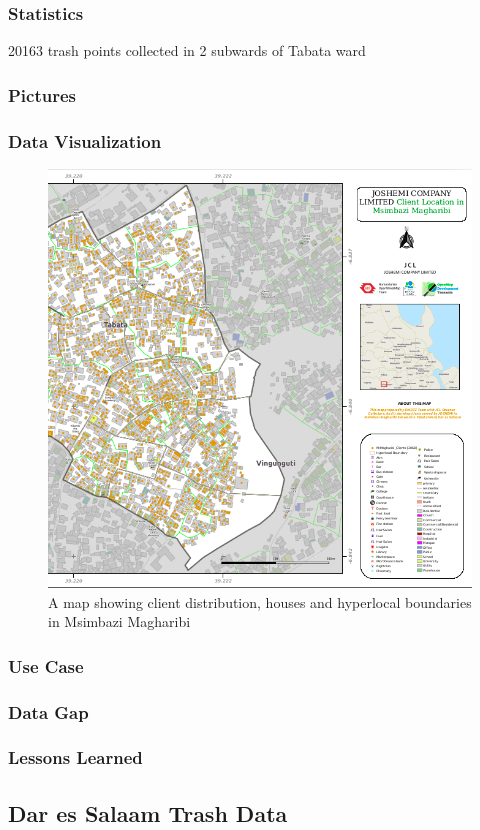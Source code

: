 \documentclass[a4paper,12pt,twoside]{article}
\begin{document}
\subsubsection{Statistics}
20163 trash points collected in 2 subwards of Tabata ward
\subsubsection{Pictures}
\newpage
\subsubsection{Data Visualization}
\begin{figure}[h]
  \color{RHgreen}\caption{A map showing client distribution, houses and hyperlocal boundaries in Msimbazi Magharibi}
  \centering
 \includegraphics[width=0.8 \textwidth]{images/msimbazi_mama_data_viz.png}
\end{figure}


\subsubsection{Use Case}
\subsubsection{Data Gap}
\subsubsection{Lessons Learned}


\newpage
\subsection{Dar es Salaam Trash Data}
\end{document}
